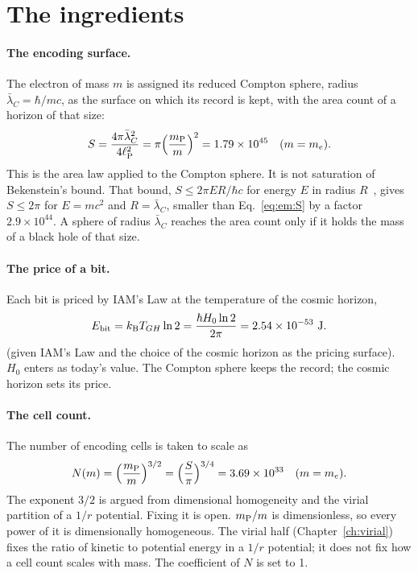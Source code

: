 \section{The ingredients}\label{sec:em:ingredients}
\paragraph{The encoding surface.} The electron of mass $m$ is assigned its reduced Compton sphere, radius $\bar\lambda_C=\hbar/mc$, as the surface
on which its record is kept, with the area count of a horizon of that size:
\begin{equation}
S=\frac{4\pi\bar\lambda_C^2}{4\ell_{\mathrm P}^2}=\pi\Big(\frac{m_{\mathrm P}}{m}\Big)^2=1.79\times10^{45}\quad(m=m_e).\label{eq:em:S}
\end{equation}
\conjecture{} This is the area law applied to the Compton sphere. It is not saturation of Bekenstein's bound. That bound, $S\le2\pi ER/\hbar c$ for
energy $E$ in radius $R$~\cite{Bekenstein1981}, gives $S\le2\pi$ for $E=mc^2$ and $R=\bar\lambda_C$, smaller than Eq.~\eqref{eq:em:S} by a factor
$2.9\times10^{44}$. \calc{} A sphere of radius $\bar\lambda_C$ reaches the area count only if it holds the mass of a black hole of that size.

\paragraph{The price of a bit.} Each bit is priced by IAM's Law at the temperature of the cosmic horizon,
\begin{equation}
E_{\rm bit}=k_{\mathrm B} T_{GH}\ln2=\frac{\hbar H_0\ln2}{2\pi}=2.54\times10^{-53}\ {\rm J}.\label{eq:em:Ebit}
\end{equation}
\derived{} (given IAM's Law and the choice of the cosmic horizon as the pricing surface). $H_0$ enters as today's value. The Compton sphere keeps
the record; the cosmic horizon sets its price.

\paragraph{The cell count.} The number of encoding cells is taken to scale as
\begin{equation}
N(m)=\Big(\frac{m_{\mathrm P}}{m}\Big)^{3/2}=\Big(\frac S\pi\Big)^{3/4}=3.69\times10^{33}\quad(m=m_e).\label{eq:em:N}
\end{equation}
\conjecture{} The exponent $3/2$ is argued from dimensional homogeneity and the virial partition of a $1/r$ potential. Fixing it is open.
$m_{\mathrm P}/m$ is dimensionless, so every power of it is dimensionally homogeneous. The virial half (Chapter~\ref{ch:virial}) fixes the ratio of kinetic
to potential energy in a $1/r$ potential; it does not fix how a cell count scales with mass. \derived{} The coefficient of $N$ is set to 1.

